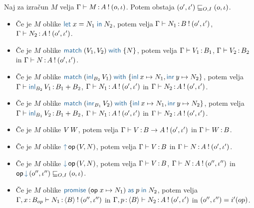 \begin{lema}\label{lem:inversion-lema}
	Naj za izračun $M$ velja $\Gamma \vdash M \mathinner{:} A \mathbin{!} (o, \iota)$. Potem obstaja $(o', \iota') \sqsubseteq_{O, I} (o, \iota)$.
	\begin{itemize}
		\item Če je $M$ oblike $\tmlet{x}{N_1}{N_2}$, potem velja $\Gamma \vdash N_1 \mathinner{:} B \mathbin{!} (o', \iota')$, $\Gamma \vdash N_2 \mathinner{:} A \mathbin{!} (o', \iota')$.
	
		\item Če je $M$ oblike $\tmmatch{\tmpair{V_1}{V_2}}{N}$, potem velja $\Gamma \vdash V_1 \mathinner{:} B_1$, $\Gamma \vdash V_2 \mathinner{:} B_2$ in $\Gamma \vdash N \mathinner{:} A \mathbin{!} (o', \iota')$.
		
		\item Če je $M$ oblike $\tmmatch{(\tminl[B_2]{V_1})}{\tminl{x} \mapsto N_1, \tminr{y} \mapsto N_2}$, potem velja $\Gamma \types \tminl[B_2]{V_1} \of B_1 + B_2$, $\Gamma \vdash N_1 \mathinner{:} A \mathbin{!} (o', \iota')$ in $\Gamma \vdash N_2 \mathinner{:} A \mathbin{!} (o', \iota')$.
		
		\item Če je $M$ oblike $\tmmatch{(\tminr[B_1]{V_2})}{\tminl{x} \mapsto N_1, \tminr{y} \mapsto N_2}$, potem velja $\Gamma \types \tminl[B_1]{V_2} \of B_1 + B_2$, $\Gamma \vdash N_1 \mathinner{:} A \mathbin{!} (o', \iota')$ in $\Gamma \vdash N_2 \mathinner{:} A \mathbin{!} (o', \iota')$.
		
		\item Če je $M$ oblike $V\,W$, potem velja $\Gamma \vdash V \mathinner{:} B \to A \mathbin{!} (o', \iota')$ in $\Gamma \vdash W \mathinner{:} B$.
		
		\item Če je $M$ oblike $\tmopout{op}{V}{N}$, potem velja $\Gamma \vdash V \mathinner{:} B$ in $\Gamma \vdash N \mathinner{:} A \mathbin{!} (o', \iota')$.
		
		\item Če je $M$ oblike $\tmopin{op}{V}{N}$, potem velja $\Gamma \vdash V \mathinner{:} B$, $\Gamma \vdash N \mathinner{:} A \mathbin{!} (o'', \iota'')$ in $\opincomp{op}{(\o'', \i'')} \order{O, I} (\o, \i)$.
		
		\item Če je $M$ oblike $\tmwith{op}{x}{N_1}{p}{N_2}$, potem velja $\Gamma, x \mathinner{:} B_{op} \vdash N_1 \mathinner{:} \langle B \rangle \mathbin{!} (o'', \iota'')$ in $\Gamma, p \mathinner{:} \langle B \rangle \vdash N_2 \mathinner{:} A \mathbin{!} (o', \iota')$ in $(o'', \iota'') = i'(op)$.
		
	\end{itemize}
\end{lema}

